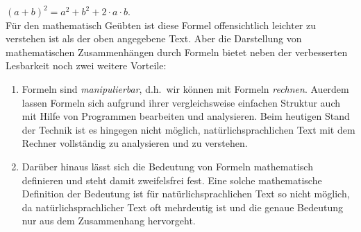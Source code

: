 \hspace*{1.3cm} $(a+b)^2 = a^2 + b^2 + 2\cdot a\cdot b$. \\[0.2cm]
F\"ur den mathematisch Ge\"ubten ist diese Formel offensichtlich leichter zu verstehen ist als
der oben angegebene Text.  Aber die Darstellung von mathematischen Zusammenh\"angen durch
Formeln bietet neben der verbesserten Lesbarkeit noch zwei weitere Vorteile:
\begin{enumerate}
\item Formeln sind \emph{manipulierbar}, d.h.~wir k\"onnen mit Formeln \emph{rechnen}.
      Au\3erdem lassen Formeln sich aufgrund ihrer vergleichsweise einfachen Struktur auch 
      mit Hilfe von Programmen bearbeiten und analysieren.  Beim heutigen Stand der Technik ist
      es hingegen nicht m\"oglich, nat\"urlichsprachlichen Text mit dem Rechner vollst\"andig
      zu analysieren und zu verstehen.
\item Dar\"uber hinaus l\"asst sich die Bedeutung von Formeln mathematisch definieren und
      steht damit zweifelsfrei fest.  Eine solche mathematische Definition der Bedeutung
      ist f\"ur nat\"urlichsprachlichen Text so nicht m\"oglich, da
      nat\"urlichsprachlicher Text oft mehrdeutig ist und die genaue Bedeutung nur
      aus dem Zusammenhang hervorgeht.
\end{enumerate}

